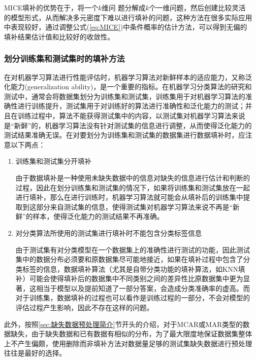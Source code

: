 \documentclass[a4paper]{ctexart}
\begin{document}
\begin{enumerate}
	      MICE填补的优势在于，将一个$k$维问 题分解成$k$个一维问题，然后创建比较灵活的模型形式，从而解决多元密度下难以进行填补的问题，这种方法在很多实际应用中表现较好，通过调整公式(\ref{eq:MICE})中条件概率的估计方法，可以得到无偏的填补结果估计值和比较好的收敛性。
\end{enumerate}

\subsubsection{划分训练集和测试集时的填补方法}\label{subsec:划分训练集和测试集时的填补方法}
在对机器学习算法进行性能评估时，机器学习算法对新鲜样本的适应能力，又称泛化能力(generalization ability)，是一个重要的指标。在机器学习分类算法的研究和测试中，通常会将数据集划分为训练集和测试集，训练集用于对机器学习算法的准确性进行训练提升，测试集用于对训练好的算法进行准确性和泛化能力的测试；并且在训练过程中，算法不能获得测试集中的内容，以测试集对机器学习算法来说是“新鲜”的，机器学习算法没有针对测试集的信息进行调整，从而使得泛化能力的测试结果准确无误。在对要划分为训练集和测试集的数据集进行数据填补时，应注意以下两点：
\begin{enumerate}
	\item 训练集和测试集分开填补

	      由于数据填补是一种使用未缺失数据中的信息对缺失的信息进行估计和判断的过程，因此在划分训练集和测试集的情况下，如果将训练集和测试集放在一起进行填补，那么在进行训练时，机器学习算法就可能会从填补后的训练集中提取到这部分来自测试集的信息，使得测试集对机器学习算法来说不再是“新鲜”的样本，使得泛化能力的测试结果不再准确。

	\item 对分类算法所使用的测试集进行填补时不能包含分类标签信息

	      由于测试集有对分类模型在一个数据集上的准确性进行测试的功能，因此测试集中的数据分布必须要和原数据集尽可能地接近，如果在填补过程中包含了分类标签的信息，数据填补算法（尤其是自带分类功能的填补算法，如KNN填补）可能会使得填补后的数据集中不同类别之间的差异性比原数据集中更为显著，这相当于模型以及提前知道了一部分答案，会造成分类准确率的虚高。而对于训练集，数据填补的过程也可以看作是训练过程的一部分，不会对模型的评估过程产生影响，因此不存在这样的问题。

\end{enumerate}

此外，按照\ref{sec:缺失数据预处理简介}节开头的介绍，对于MCAR或MAR类型的数据缺失，由于缺失数据和已有数据有相似的分布，为了最大限度地保证数据集整体上不产生偏颇，使用删除而非填补方法对数据量足够的测试集缺失数据进行预处理往往是最好的选择。
\end{document}
